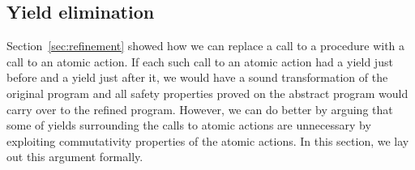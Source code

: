 \subsection{Yield elimination}
\label{sec:yield-elimination}

Section~\ref{sec:refinement} showed how we can replace a call to a procedure with 
a call to an atomic action.
If each such call to an atomic action had a yield just before and a yield just after it,
we would have a sound transformation of the original program and all safety properties proved
on the abstract program would carry over to the refined program.
However, we can do better by arguing that some of yields surrounding the calls to atomic actions 
are unnecessary by exploiting commutativity properties of the atomic actions.
In this section, we lay out this argument formally.


